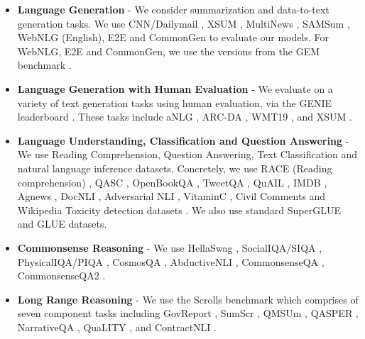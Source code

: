 \documentclass[10pt]{article}
\begin{document}
\begin{itemize}
    \item  \textbf{Language Generation} - We consider summarization and data-to-text generation tasks. We use CNN/Dailymail \citep{hermann2015teaching}, XSUM \citep{Narayan2018DontGM}, MultiNews \citep{fabbri2019multi}, SAMSum \citep{gliwa2019samsum}, WebNLG \citep{castro-ferreira20:bilin-bi-direc-webnl-shared} (English), E2E  \citep{e2e_cleaned} and CommonGen \citep{lin-etal-2020-commongen} to evaluate our models. For WebNLG, E2E and CommonGen, we use the versions from the GEM benchmark \citep{gehrmann2021gem}. 
    \item \textbf{Language Generation with Human Evaluation} - We evaluate on a variety of text generation tasks using human evaluation, via the GENIE leaderboard \citep{genie}. These tasks include aNLG \citep{bhagavatula2019abductive}, ARC-DA \citep{ARC}, WMT19 \citep{wmt19translate}, and XSUM \citep{Narayan2018DontGM}. 
    \item \textbf{Language Understanding, Classification and Question Answering} - We use Reading Comprehension, Question Answering, Text Classification and natural language inference datasets. Concretely, we use RACE (Reading comprehension) \citep{lai-etal-2017-race}, QASC \citep{khot2020qasc}, OpenBookQA \citep{mihaylov2018can}, TweetQA \citep{xiong2019tweetqa}, QuAIL \citep{rogers2020getting}, IMDB \citep{maas-EtAl:2011:ACL-HLT2011}, Agnews \citep{zhang2015character}, DocNLI \citep{yin2021docnli}, Adversarial NLI \citep{nie2019adversarial}, VitaminC \citep{schuster2021get}, Civil Comments and Wikipedia Toxicity detection datasets \citep{DBLP:journals/corr/abs-1903-04561}. We also use standard SuperGLUE \citep{wang2019superglue} and GLUE \citep{wang2018glue} datasets.
    \item \textbf{Commonsense Reasoning} - We use HellaSwag \citep{zellers2019hellaswag}, SocialIQA/SIQA \citep{sap2019socialiqa}, PhysicalIQA/PIQA \citep{bisk2020piqa}, CosmosQA \citep{huang2019cosmos}, AbductiveNLI \citep{bhagavatula2019abductive}, CommonsenseQA \citep{talmor2018commonsenseqa}, CommonsenseQA2 \citep{talmor2021commonsenseqa}.
    \item \textbf{Long Range Reasoning} - We use the Scrolls benchmark \citep{shaham2022scrolls} which comprises of seven component tasks including GovReport \citep{huang2021efficient}, SumScr \citep{chen2021summscreen}, QMSUm \citep{zhong2021qmsum}, QASPER \citep{dasigi2021dataset}, NarrativeQA \citep{Kocisky2018narrativeqa}, QuaLITY \citep{pang2021quality}, and ContractNLI \citep{koreeda2021contractnli}.

\end{itemize}
\end{document}
